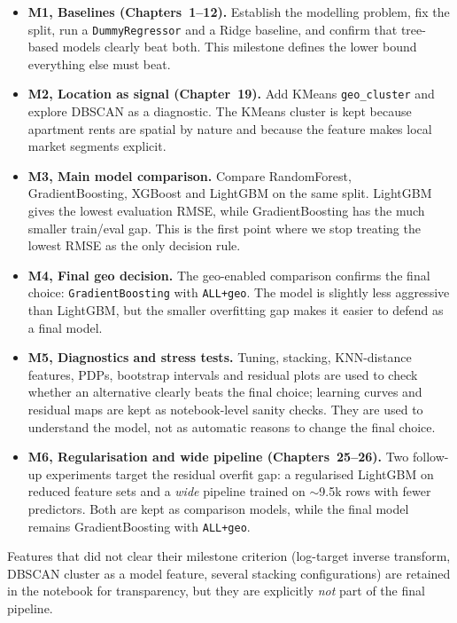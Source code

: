 \documentclass[11pt,a4paper]{article}
\begin{document}
\begin{itemize}
    \item \textbf{M1, Baselines (Chapters~1--12).} Establish the modelling problem, fix the split, run a \texttt{DummyRegressor} and a Ridge baseline, and confirm that tree-based models clearly beat both. This milestone defines the lower bound everything else must beat.
    \item \textbf{M2, Location as signal (Chapter~19).} Add KMeans \texttt{geo\_cluster} and explore DBSCAN as a diagnostic. The KMeans cluster is kept because apartment rents are spatial by nature and because the feature makes local market segments explicit.
    \item \textbf{M3, Main model comparison.} Compare RandomForest, GradientBoosting, XGBoost and LightGBM on the same split. LightGBM gives the lowest evaluation RMSE, while GradientBoosting has the much smaller train/eval gap. This is the first point where we stop treating the lowest RMSE as the only decision rule.
    \item \textbf{M4, Final geo decision.} The geo-enabled comparison confirms the final choice: \texttt{GradientBoosting} with \texttt{ALL+geo}. The model is slightly less aggressive than LightGBM, but the smaller overfitting gap makes it easier to defend as a final model.
    \item \textbf{M5, Diagnostics and stress tests.} Tuning, stacking, KNN-distance features, PDPs, bootstrap intervals and residual plots are used to check whether an alternative clearly beats the final choice; learning curves and residual maps are kept as notebook-level sanity checks. They are used to understand the model, not as automatic reasons to change the final choice.
    \item \textbf{M6, Regularisation and wide pipeline (Chapters~25--26).} Two follow-up experiments target the residual overfit gap: a regularised LightGBM on reduced feature sets and a \emph{wide} pipeline trained on $\sim$9.5k rows with fewer predictors. Both are kept as comparison models, while the final model remains GradientBoosting with \texttt{ALL+geo}.
\end{itemize}

Features that did not clear their milestone criterion (log-target inverse transform, DBSCAN cluster as a model feature, several stacking configurations) are retained in the notebook for transparency, but they are explicitly \emph{not} part of the final pipeline.
\end{document}
